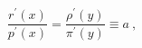 \begin{equation}
\frac{r^{\prime}(x)}{p^{\prime}(x)} =
\frac{{\rho}^{\prime}(y)}{{\pi}^{\prime}(y)} \equiv a\ ,
\label{2.11}
\end{equation}

